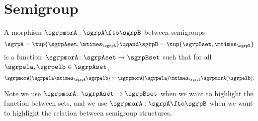 
\section{Semigroup \wHomos}

\begin{ctdefinition}
  \label{def:semigroup-mor}
   A morphism $\sgrpmorA: \sgrpA \fto \sgrpB$ between semigroups
  \begin{equation}
  \sgrpA = \tup{\sgrpAset, \mtimes_\sgrpA}
   \qqand
   \sgrpB = \tup{\sgrpBset, \mtimes_\sgrpB}
   \end{equation}
     is a function~$\sgrpmorA\colon \sgrpAset \to \sgrpBset$
      such that for all $\sgrpela, \sgrpelb \in \sgrpAset$,
  \begin{equation}
    \label{eq:sgrp-mor-comp}
    \sgrpmorA(\sgrpela \mtimes_{\sgrpA} \sgrpelb) = \sgrpmorA (\sgrpela) \mtimes_{\sgrpB} \sgrpmorA(\sgrpelb).
  \end{equation}
\end{ctdefinition}
 Note we use $\sgrpmorA\colon \sgrpAset \to \sgrpBset$ when we want to highlight
 the function between sets, and we use
 $\sgrpmorA: \sgrpA \fto \sgrpB$
 when we want to highlight the relation between semigroup structures.

